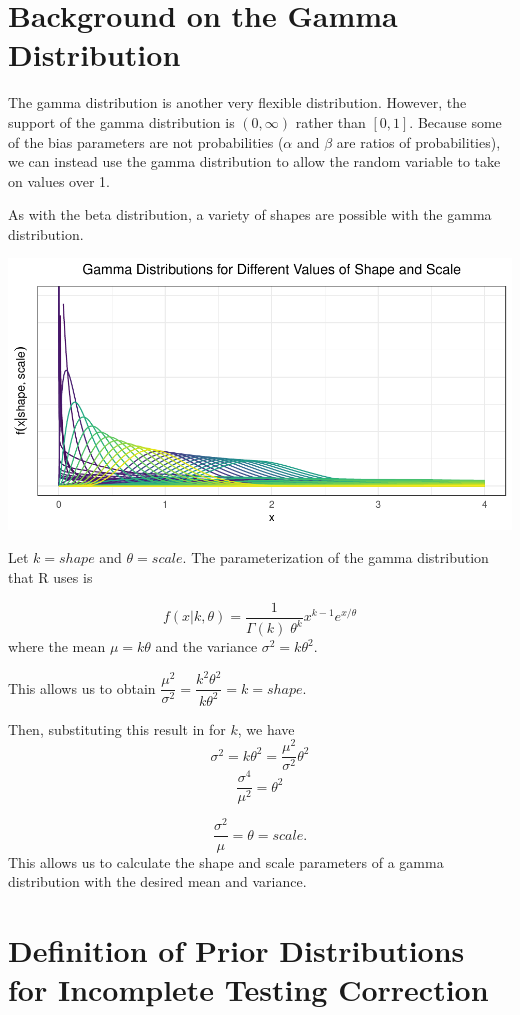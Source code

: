 \documentclass[12pt,twoside]{smiththesis}
\begin{document}
\hypertarget{background-on-the-gamma-distribution}{%
\section{Background on the Gamma Distribution}\label{background-on-the-gamma-distribution}}

The gamma distribution is another very flexible distribution. However, the support of the gamma distribution is \((0,\infty)\) rather than \([0,1]\). Because some of the bias parameters are not probabilities (\(\alpha\) and \(\beta\) are ratios of probabilities), we can instead use the gamma distribution to allow the random variable to take on values over 1.

As with the beta distribution, a variety of shapes are possible with the gamma distribution.
\begin{center}\includegraphics[width=0.9\linewidth]{thesis_files/figure-latex/unnamed-chunk-52-1} \end{center}

Let \(k=shape\) and \(\theta=scale\). The parameterization of the gamma distribution that R uses is

\[f(x|k,\theta) = \frac{1}{\Gamma(k) \;\theta^k}x^{k-1} e^{x/\theta}\]
where the mean \(\mu =k\theta\) and the variance \(\sigma^2 = k\theta^2\).

This allows us to obtain \(\dfrac{\mu^2}{\sigma^2} = \dfrac{k^2 \theta^2}{k\theta^2} = k =shape\).

Then, substituting this result in for \(k\), we have \[\sigma^2 = k \theta^2 = \dfrac{\mu^2}{\sigma^2} \theta^2\]
\[\frac{\sigma^4}{\mu^2}=\theta^2\]

\[\frac{\sigma^2}{\mu}=\theta = scale.\]
This allows us to calculate the shape and scale parameters of a gamma distribution with the desired mean and variance.

\hypertarget{definition-of-prior-distributions-for-incomplete-testing-correction}{%
\section{Definition of Prior Distributions for Incomplete Testing Correction}\label{definition-of-prior-distributions-for-incomplete-testing-correction}}
\end{document}
